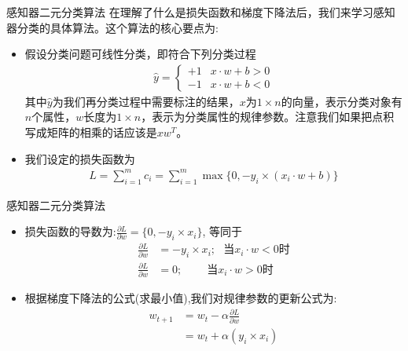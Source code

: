 \documentclass[handout]{ctexbeamer}
\begin{document}
\begin{frame}{感知器二元分类算法}
在理解了什么是损失函数和梯度下降法后，我们来学习感知器分类的具体算法。这个算法的核心要点为:
	\begin{itemize}
		\item 假设分类问题可线性分类，即符合下列分类过程 \begin{align*}
		\hat{y} = \begin{cases}
			+1 & x \cdot w + b > 0 \\
			-1 & x \cdot w  + b < 0
		\end{cases}
	\end{align*}
	其中$\hat{y}$为我们再分类过程中需要标注的结果，$x$为$1\times n$的向量，表示分类对象有$n$个属性，$w$长度为$1 \times n$，表示为分类属性的规律参数。注意我们如果把点积写成矩阵的相乘的话应该是$x w^T$。
	\item 我们设定的损失函数为 \begin{align*}
		L = \sum_{i=1}^m c_i = \sum_{i=1}^m \max \{ 0, - y_i \times (x_i \cdot w + b) \} 
	\end{align*}
	\end{itemize}
\end{frame}

\begin{frame}{感知器二元分类算法}
	\begin{itemize}
		\item  损失函数的导数为:$\frac{\partial L}{\partial w} = \{ 0, -y_i \times x_i \}$, 等同于
	\begin{align*}
		\frac{\partial L}{\partial w} & = - y_i \times x_i; \ \ \ \text{当$x_i \cdot w < 0$时} \\
		\frac{\partial L}{\partial w} & = 0; \ \ \ \ \ \ \ \ \ \ \text{当$x_i \cdot w > 0$时}
	\end{align*}
	\item 根据梯度下降法的公式(求最小值),我们对规律参数的更新公式为: \begin{align*}
		w_{t+1} & = w_{t} - \alpha \frac{\partial L}{\partial w} \\
		& = w_{t} + \alpha (y_i \times x_i) \tag{当$x_i \cdot w < 0$}
	\end{align*}
	\end{itemize}
\end{frame}
\end{document}
